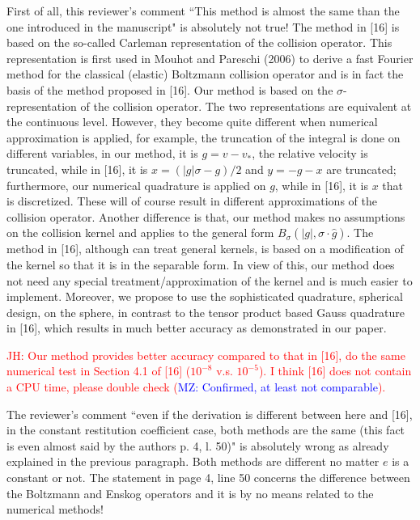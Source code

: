 \documentclass[11pt]{article}
\newcommand{\jh}[1]{\textcolor{red}{JH: #1}}
\newcommand{\mz}[1]{\textcolor{blue}{MZ: #1}}
\begin{document}
First of all, this reviewer's comment ``This method is almost the same than the one introduced in the manuscript" is absolutely not true! The method in [16] is based on the so-called Carleman representation of the collision operator. This representation is first used in Mouhot and Pareschi (2006) to derive a fast Fourier method for the classical (elastic) Boltzmann collision operator and is in fact the basis of the method proposed in [16]. Our method is based on the $\sigma$-representation of the collision operator. The two representations are equivalent at the continuous level. However, they become quite different when numerical approximation is applied, for example, the truncation of the integral is done on different variables, in our method, it is $g=v-v_*$, the relative velocity is truncated, while in [16], it is $x=(|g|\sigma-g)/2$ and $y=-g-x$ are truncated; furthermore, our numerical quadrature is applied on $g$, while in [16], it is $x$ that is discretized. These will of course result in different approximations of the collision operator. Another difference is that, our method makes no assumptions on the collision kernel and applies to the general form $B_{\sigma}(|g|,\sigma\cdot \hat{g})$. The method in [16], although can treat general kernels, is based on a modification of the kernel so that it is in the separable form. In view of this, our method does not need any special treatment/approximation of the kernel and is much easier to implement. Moreover, we propose to use the sophisticated quadrature, spherical design, on the sphere, in contrast to the tensor product based Gauss quadrature in [16], which results in much better accuracy as demonstrated in our paper.

\jh{Our method provides better accuracy compared to that in [16], do the same numerical test in Section 4.1 of [16] ($10^{-8}$ v.s. $10^{-5}$). I think [16] does not contain a CPU time, please double check (\mz{Confirmed, at least not comparable}).}

The reviewer's comment ``even if the derivation is different between here and [16], in the constant restitution coefficient case, both methods are the same (this fact is even almost said by the authors p. 4, l. 50)" is absolutely wrong as already explained in the previous paragraph. Both methods are different no matter $e$ is a constant or not. The statement in page 4, line 50 concerns the difference between the Boltzmann and Enskog operators and it is by no means related to the numerical methods!
\end{document}
